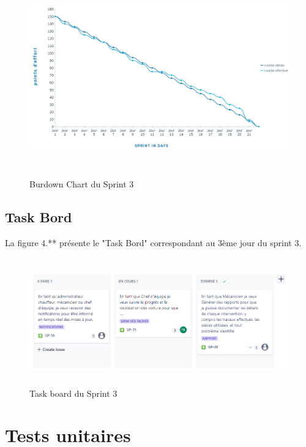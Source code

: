 \begin{figure}[h!]
    \centering
    \includegraphics[width=1\textwidth, height=8.5cm]{chap5.images/Burndown chart sprint 3.png}
    \caption{ Burdown Chart du Sprint 3}

\end{figure}


\subsection{Task Bord}
La figure 4.** présente le "Task Bord" correspondant au 3ème jour du sprint 3.

\begin{figure}[h!]
    \centering
    \includegraphics[width=1\textwidth,height=5.5cm]{chap5.images/task board sprint 3.png}
    \caption{ Task board du Sprint 3 }

\end{figure}

\section{Tests unitaires}

